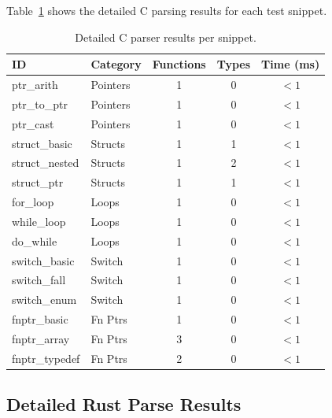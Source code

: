 \documentclass[11pt,a4paper]{article}
\begin{document}
\begin{appendices}
Table~\ref{tab:cparse-detail} shows the detailed C parsing results for
each test snippet.

\begin{table}[h]
\centering
\caption{Detailed C parser results per snippet.}
\label{tab:cparse-detail}
\begin{tabular}{llccc}
\toprule
ID & Category & Functions & Types & Time (ms) \\
\midrule
ptr\_arith     & Pointers  & 1 & 0 & $<1$ \\
ptr\_to\_ptr   & Pointers  & 1 & 0 & $<1$ \\
ptr\_cast      & Pointers  & 1 & 0 & $<1$ \\
struct\_basic  & Structs   & 1 & 1 & $<1$ \\
struct\_nested & Structs   & 1 & 2 & $<1$ \\
struct\_ptr    & Structs   & 1 & 1 & $<1$ \\
for\_loop      & Loops     & 1 & 0 & $<1$ \\
while\_loop    & Loops     & 1 & 0 & $<1$ \\
do\_while      & Loops     & 1 & 0 & $<1$ \\
switch\_basic  & Switch    & 1 & 0 & $<1$ \\
switch\_fall   & Switch    & 1 & 0 & $<1$ \\
switch\_enum   & Switch    & 1 & 0 & $<1$ \\
fnptr\_basic   & Fn Ptrs   & 1 & 0 & $<1$ \\
fnptr\_array   & Fn Ptrs   & 3 & 0 & $<1$ \\
fnptr\_typedef & Fn Ptrs   & 2 & 0 & $<1$ \\
\bottomrule
\end{tabular}
\end{table}

\subsection{Detailed Rust Parse Results}


\end{appendices}
\end{document}
